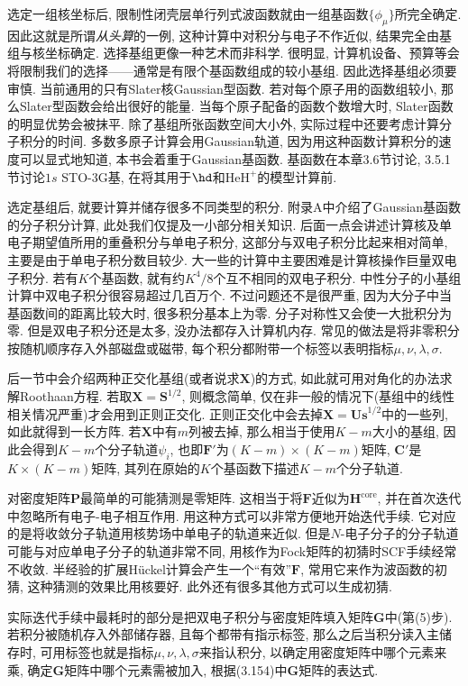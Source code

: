 选定一组核坐标后, 限制性闭壳层单行列式波函数就由一组基函数$\{\phi_\mu\}$所完全确定. 因此这就是所谓\emph{从头算}的一例, 这种计算中对积分与电子\ha 不作近似, 结果完全由基组与核坐标确定. 选择基组更像一种艺术而非科学. 很明显, 计算机设备、预算等会将限制我们的选择——通常是有限个基函数组成的较小基组. 因此选择基组必须要审慎. 当前通用的只有Slater核Gaussian型函数. 若对每个原子用的函数组较小, 那么Slater型函数会给出很好的能量. 当每个原子配备的函数个数增大时, Slater函数的明显优势会被抹平. 除了基组所张函数空间大小外, 实际过程中还要考虑计算分子积分的时间. 多数多原子计算会用Gaussian轨道, 因为用这种函数计算积分的速度可以显式地知道, 本书会着重于Gaussian基函数. 基函数在本章3.6节讨论, 3.5.1节讨论$1s$ STO-3G基, 在将其用于$\hd$和$\mathrm{HeH}^+$的模型计算前.

选定基组后, 就要计算并储存很多不同类型的积分. 附录A中介绍了Gaussian基函数的分子积分计算, 此处我们仅提及一小部分相关知识. 后面一点会讲述计算核\ha 及单电子期望值所用的重叠积分与单电子积分, 这部分与双电子积分比起来相对简单, 主要是由于单电子积分数目较少. 大一些的计算中主要困难是计算核操作巨量双电子积分. 若有$K$个基函数, 就有约$K^4/8$个互不相同的双电子积分. 中性分子的小基组计算中双电子积分很容易超过几百万个. 不过问题还不是很严重, 因为大分子中当基函数间的距离比较大时, 很多积分基本上为零. 分子对称性又会使一大批积分为零. 但是双电子积分还是太多, 没办法都存入计算机内存. 常见的做法是将非零积分按随机顺序存入外部磁盘或磁带, 每个积分都附带一个标签以表明指标$\mu,\nu,\lambda,\sigma$.

后一节中会介绍两种正交化基组(或者说求$\mathbf{X}$)的方式, 如此就可用对角化的办法求解Roothaan方程. 若取$\mathbf{X=S}^{1/2}$, 则概念简单, 仅在非一般的情况下(基组中的线性相关情况严重)才会用到正则正交化. 正则正交化中会去掉$\mathbf{X=Us}^{1/2}$中的一些列, 如此就得到一长方阵. 若$\mathbf{X}$中有$m$列被去掉, 那么相当于使用$K-m$大小的基组, 因此会得到$K-m$个分子轨道$\psi_i$, 也即$\mathbf{F'}$为$(K-m)\times(K-m)$矩阵, $\mathbf{C'}$是$K\times(K-m)$矩阵, 其列在原始的$K$个基函数下描述$K-m$个分子轨道.

对密度矩阵$\mathbf{P}$最简单的可能猜测是零矩阵. 这相当于将$\mathbf{F}$近似为$\mathbf{H}^\mathrm{core}$, 并在首次迭代中忽略所有电子-电子相互作用. 用这种方式可以非常方便地开始迭代手续. 它对应的是将收敛分子轨道用核势场中单电子的轨道来近似. 但是$N$-电子分子的分子轨道可能与对应单电子分子的轨道非常不同, 用核\ha 作为Fock矩阵的初猜时SCF手续经常不收敛. 半经验的扩展H\"uckel计算会产生一个``有效''$\mathbf{F}$, 常用它来作为波函数的初猜, 这种猜测的效果比用核\ha 要好. 此外还有很多其他方式可以生成初猜.

实际迭代手续中最耗时的部分是把双电子积分与密度矩阵填入矩阵$\mathbf{G}$中(第(5)步). 若积分被随机存入外部储存器, 且每个都带有指示标签, 那么之后当积分读入主储存时, 可用标签也就是指标$\mu,\nu,\lambda,\sigma$来指认积分, 以确定用密度矩阵中哪个元素来乘, 确定$\mathbf{G}$矩阵中哪个元素需被加入, 根据(3.154)中$\mathbf{G}$矩阵的表达式.

